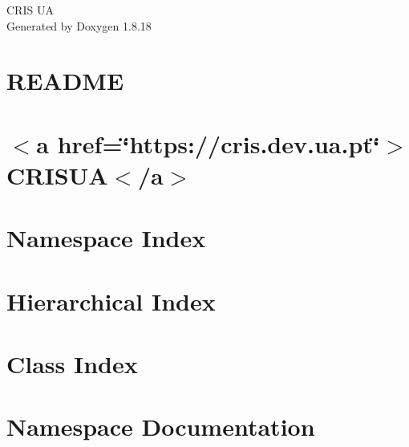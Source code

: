 \let\mypdfximage\pdfximage\def\pdfximage{\immediate\mypdfximage}\documentclass[twoside]{book}
\newcommand{\+}{\discretionary{\mbox{\scriptsize$\hookleftarrow$}}{}{}}
\newcommand{\clearemptydoublepage}{%
  \newpage{\pagestyle{empty}\cleardoublepage}%
}
\begin{document}
\hypersetup{pageanchor=false,
             bookmarksnumbered=true,
             pdfencoding=unicode
            }
\begin{titlepage}
\vspace*{7cm}
\begin{center}%
{\Large C\+R\+IS UA }\\
\vspace*{1cm}
{\large Generated by Doxygen 1.8.18}\\
\end{center}
\end{titlepage}
\clearemptydoublepage
{}
\tableofcontents
\clearemptydoublepage
{}
\hypersetup{pageanchor=true}

\chapter{R\+E\+A\+D\+ME}
\label{md__m_v_c-2020-_templates__r_e_a_d_m_e}

\chapter{$<$a href=\char`\"{}https\+://cris.\+dev.\+ua.\+pt\char`\"{}$>$C\+R\+I\+S\+UA$<$/a$>$}
\label{md__r_e_a_d_m_e}

\chapter{Namespace Index}

\chapter{Hierarchical Index}

\chapter{Class Index}

\chapter{Namespace Documentation}












\end{document}
